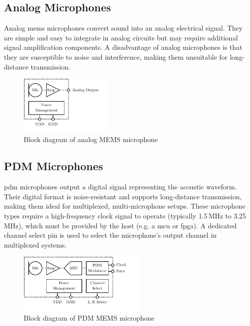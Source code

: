 \subsection{Analog Microphones} \label{sec:analog_microphones}
Analog \acrshort{mems} microphones convert sound into an analog electrical signal.
They are simple and easy to integrate in analog circuits but may require additional signal amplification components.
A disadvantage of analog microphones is that they are susceptible to noise and interference, making them unsuitable for long-distance transmission.
\begin{figure}[h!]
	\centering
	\vspace{-0.1cm}
	\includegraphics[height=2.9cm, trim={0 0.4cm 0 0}]{images/2_preliminaries/mems_microphone_types_analog.pdf}
	\caption{Block diagram of analog MEMS microphone}
	\label{fig:mems_microphone_types_analog}
\end{figure}

\subsection{PDM Microphones} \label{sec:pdm_microphones}
\acrshort{pdm} microphones output a digital signal representing the acoustic waveform.
Their digital format is noise-resistant and supports long-distance transmission, making them ideal for multiplexed, multi-microphone setups.
These microphone types require a high-frequency clock signal to operate (typically 1.5\,MHz to 3.25\,MHz),
which must be provided by the host (e.g. a \acrshort{mcu} or \acrshort{fpga}).
A dedicated channel select pin is used to select the microphone's output channel in multiplexed systems.
\begin{figure}[h!]
	\centering
	\vspace{-0.1cm}
	\includegraphics[height=2.9cm, trim={0 0.4cm 0 0}]{images/2_preliminaries/mems_microphone_types_pdm.pdf}
	\caption{Block diagram of PDM MEMS microphone}
	\label{fig:mems_microphone_types_pdm}
\end{figure}

